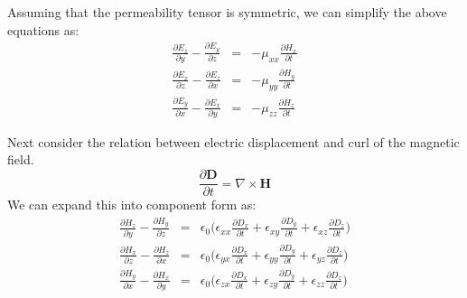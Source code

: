 \documentclass{article}[12pt]
\theoremstyle{plain}
\begin{document}
Assuming that the permeability tensor is symmetric, we can simplify the above
equations as:
\begin{eqnarray}
\frac{\partial E_z}{\partial y} - \frac{\partial E_y}{\partial z} & = & - \mu_{xx} \frac{\partial H_x}{\partial t}  \label{eqn:maxwell-component-begin} \\
\frac{\partial E_x}{\partial z} - \frac{\partial E_z}{\partial x} & = & - \mu_{yy} \frac{\partial H_y}{\partial t} \\
\frac{\partial E_y}{\partial x} - \frac{\partial E_x}{\partial y} & = & - \mu_{zz} \frac{\partial H_z}{\partial t} 
\end{eqnarray}

Next consider the relation between electric displacement and curl of the
magnetic field.
\begin{equation}
\frac{\partial \mathbf{D}}{\partial t}  =  \nabla \times \mathbf{H} \nonumber
\end{equation}
We can expand this into component form as:
\begin{eqnarray}
\frac{\partial H_z}{\partial y} - \frac{\partial H_y}{\partial z} & = & \epsilon_0 \big( \epsilon_{xx} \frac{\partial D_x}{\partial t}  + \epsilon_{xy} \frac{\partial D_y}{\partial t}  + \epsilon_{xz} \frac{\partial D_z}{\partial t}  \big) \\
\frac{\partial H_x}{\partial z} - \frac{\partial H_z}{\partial x} & = & \epsilon_0 \big( \epsilon_{yx} \frac{\partial D_x}{\partial t}  + \epsilon_{yy} \frac{\partial D_y}{\partial t}  + \epsilon_{yz} \frac{\partial D_z}{\partial t}  \big)  \\
\frac{\partial H_y}{\partial x} - \frac{\partial H_x}{\partial y} & = & \epsilon_0 \big( \epsilon_{zx} \frac{\partial D_x}{\partial t}  + \epsilon_{zy} \frac{\partial D_y}{\partial t}  + \epsilon_{zz} \frac{\partial D_z}{\partial t}  \big)  \label{eqn:maxwell-component-end}
\end{eqnarray}
\end{document}
